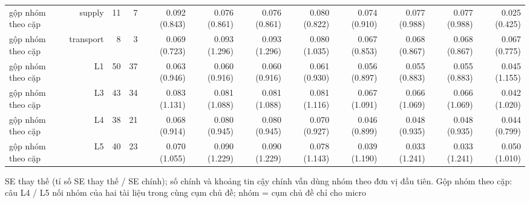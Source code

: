 \begin{table}[ht]
\begin{tabular}{lrrrrrrrrrrr}
gộp nhóm theo cặp & supply & 11 & 7 & 0.092 (0.843) & 0.076 (0.861) & 0.076 (0.861) & 0.080 (0.822) & 0.074 (0.910) & 0.077 (0.988) & 0.077 (0.988) & 0.025 (0.425) \\
gộp nhóm theo cặp & transport & 8 & 3 & 0.069 (0.723) & 0.093 (1.296) & 0.093 (1.296) & 0.080 (1.035) & 0.067 (0.853) & 0.068 (0.867) & 0.068 (0.867) & 0.067 (0.775) \\
gộp nhóm theo cặp & L1 & 50 & 37 & 0.063 (0.946) & 0.060 (0.916) & 0.060 (0.916) & 0.061 (0.930) & 0.056 (0.897) & 0.055 (0.883) & 0.055 (0.883) & 0.045 (1.155) \\
gộp nhóm theo cặp & L3 & 43 & 34 & 0.083 (1.131) & 0.081 (1.088) & 0.081 (1.088) & 0.081 (1.116) & 0.067 (1.091) & 0.066 (1.069) & 0.066 (1.069) & 0.042 (1.020) \\
gộp nhóm theo cặp & L4 & 38 & 21 & 0.068 (0.914) & 0.080 (0.945) & 0.080 (0.945) & 0.070 (0.927) & 0.046 (0.899) & 0.048 (0.935) & 0.048 (0.935) & 0.044 (0.799) \\
gộp nhóm theo cặp & L5 & 40 & 23 & 0.070 (1.055) & 0.090 (1.229) & 0.090 (1.229) & 0.078 (1.143) & 0.039 (1.190) & 0.033 (1.241) & 0.033 (1.241) & 0.050 (1.010) \\
\bottomrule
\end{tabular}
\par\smallskip\footnotesize SE thay thế (tỉ số SE thay thế / SE chính); số chính và khoảng tin cậy chính vẫn dùng nhóm theo đơn vị đầu tiên. Gộp nhóm theo cặp: câu L4 / L5 nối nhóm của hai tài liệu trong cùng cụm chủ đề; nhóm = cụm chủ đề chỉ cho micro
\end{table}

